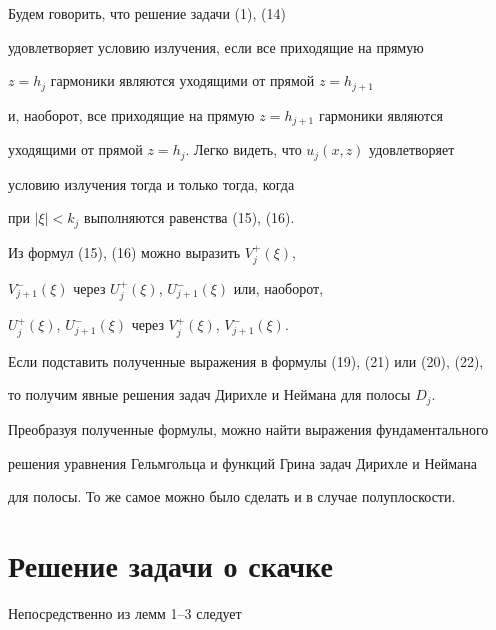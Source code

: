 \begin{note}


Будем говорить, что решение задачи (1), (14)


удовлетворяет условию излучения, если все приходящие на прямую


$z=h_j$ гармоники являются уходящими от прямой $z=h_{j+1}$


и, наоборот, все приходящие на прямую $z=h_{j+1}$ гармоники являются


уходящими от прямой $z=h_j$. Легко видеть, что $u_j(x,z)$ удовлетворяет


условию излучения тогда и только тогда, когда


при $|\xi|<k_j$ выполняются равенства (15), (16).


\end{note}





\begin{note}


Из формул (15), (16) можно выразить $V^+_j(\xi)$,


$V^-_{j+1}(\xi)$ через $U^+_j(\xi)$, $U^-_{j+1}(\xi)$ или, наоборот,


$U^+_j(\xi)$, $U^-_{j+1}(\xi)$ через $V^+_j(\xi)$, $V^-_{j+1}(\xi)$.


Если подставить полученные выражения в формулы (19), (21) или (20), (22),


то получим явные решения задач Дирихле и Неймана для полосы $D_j$.


Преобразуя полученные формулы, можно найти выражения фундаментального


решения уравнения Гельмгольца и функций Грина задач Дирихле и Неймана


для полосы. То же самое можно было сделать и в случае полуплоскости.


\end{note}





\section{Решение задачи о скачке}





Непосредственно из лемм 1--3 следует





